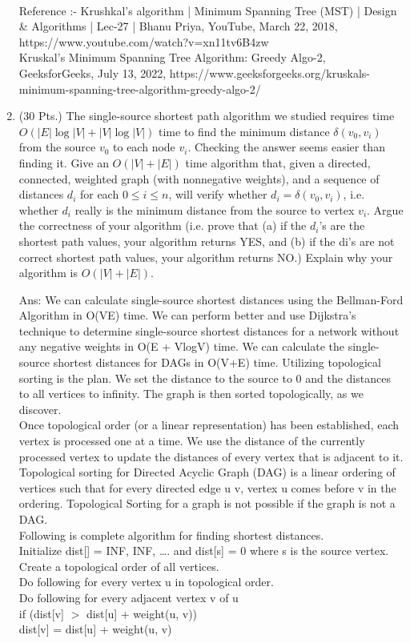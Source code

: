 \documentclass{article}
\begin{document}
\begin{enumerate}
\\Reference :- Krushkal's algorithm | Minimum Spanning Tree (MST) | Design & Algorithms | Lec-27 | Bhanu Priya, YouTube, March 22, 2018, https://www.youtube.com/watch?v=xn11tv6B4zw \\
Kruskal's Minimum Spanning Tree Algorithm: Greedy Algo-2, GeeksforGeeks, 
July 13, 2022, https://www.geeksforgeeks.org/kruskals-minimum-spanning-tree-algorithm-greedy-algo-2/ \\

  
\item (30 Pts.)  The single-source shortest path algorithm we studied
  requires time $O(|E|\log |V|+ |V|\log |V|)$ time to find the minimum
  distance $\delta(v_0, v_i)$ from the source $v_0$ to each node
  $v_i$. Checking the answer seems easier than finding it. Give an
  $O(|V|+|E|)$ time algorithm that, given a directed, connected,
  weighted graph (with nonnegative weights), and a sequence of
  distances $d_i$ for each $0\le i \le n$, will verify whether $d_i=
  \delta(v_0,v_i)$, i.e. whether $d_i$ really is the minimum distance
  from the source to vertex $v_i$. Argue the correctness of your
  algorithm (i.e. prove that (a) if the $d_i$'s are the shortest path
  values, your algorithm returns YES, and (b) if the di's are not
  correct shortest path values, your algorithm returns NO.) Explain
  why your algorithm is $O(|V|+|E|)$.
  
\item[Ans: ] We can calculate single-source shortest distances using the Bellman-Ford Algorithm in O(VE) time. We can perform better and use Dijkstra's technique to determine single-source shortest distances for a network without any negative weights in O(E + VlogV) time. We can calculate the single-source shortest distances for DAGs in O(V+E) time. Utilizing topological sorting is the plan. We set the distance to the source to 0 and the distances to all vertices to infinity. The graph is then sorted topologically, as we discover.\\
Once topological order (or a linear representation) has been established, each vertex is processed one at a time. We use the distance of the currently processed vertex to update the distances of every vertex that is adjacent to it.\\
Topological sorting for Directed Acyclic Graph (DAG) is a linear ordering of vertices such that for every directed edge u v, vertex u comes before v in the ordering. Topological Sorting for a graph is not possible if the graph is not a DAG.\\
Following is complete algorithm for finding shortest distances.\\ 
Initialize dist[] = {INF, INF, ….} and dist[s] = 0 where s is the source vertex.\\ 
Create a topological order of all vertices. \\
Do following for every vertex u in topological order. \\
Do following for every adjacent vertex v of u \\
if (dist[v] $>$ dist[u] + weight(u, v)) \\
dist[v] = dist[u] + weight(u, v) \\


\end{enumerate}
\end{document}

